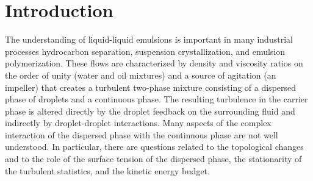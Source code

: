 
\section{Introduction} \label{sec:introduction}
The understanding of liquid-liquid emulsions is important in many industrial processes \eg hydrocarbon separation, suspension crystallization, and emulsion polymerization. These flows are characterized by density and viscosity ratios on the order of unity (\eg water and oil mixtures) and a source of agitation (\eg an impeller) that creates a turbulent two-phase mixture consisting of a dispersed phase of droplets and a continuous phase. The resulting turbulence in the carrier phase is altered directly by the droplet feedback on the surrounding fluid and indirectly by droplet-droplet interactions. Many aspects of the complex interaction of the dispersed phase with the continuous phase are not well understood. In particular, there are questions related to the topological changes and to the role of the surface tension of the dispersed phase, the stationarity of the turbulent statistics, and the kinetic energy budget.

